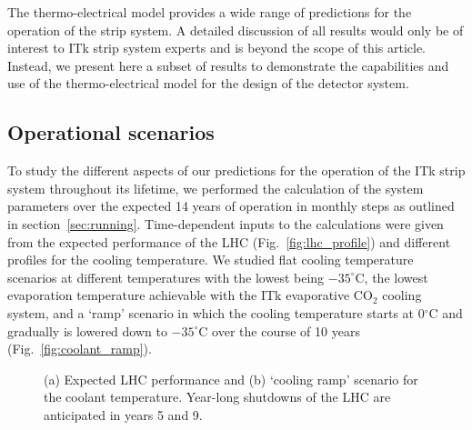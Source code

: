 
The thermo-electrical model provides a wide range of predictions for the operation of the strip system. A detailed discussion of all results would only be of interest to ITk strip system experts and is beyond the scope of this article. Instead, we present here a subset of results to demonstrate the capabilities and use of the thermo-electrical model for the design of the detector system.

\subsection{Operational scenarios}\label{sec:opscenarios}
To study the different aspects of our predictions for the operation of the ITk strip system throughout its lifetime, we performed the calculation of the system parameters over the expected 14 years of operation in monthly steps as outlined in section~\ref{sec:running}. Time-dependent inputs to the calculations were given from the expected performance of the LHC (Fig.~\ref{fig:lhc_profile}) and different profiles for the cooling temperature. We studied flat cooling temperature scenarios at different temperatures with the lowest being $-35^\circ$C, the lowest evaporation temperature achievable with the ITk evaporative CO$_2$ cooling system, and a `ramp' scenario in which the cooling temperature starts at 0$^\circ$C and gradually is lowered down to $-35^\circ$C over the course of 10 years (Fig.~\ref{fig:coolant_ramp}).

\begin{figure}[ht]
\centering
{}\quad\quad
{}
\caption{(a) Expected LHC performance and (b) `cooling ramp' scenario for the coolant temperature. Year-long shutdowns of the LHC are anticipated in years 5 and 9.}
\label{fig:opscenarios}
\end{figure}

